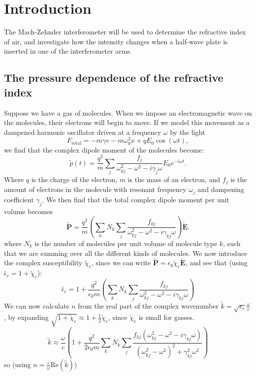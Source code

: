 \chapter{Introduction}
The Mach-Zehnder interferometer will be used to determine the refractive index of air, 
and investigate how the intensity changes when a half-wave plate is inserted in one of the interferometer arms.
\section{The pressure dependence of the refractive index}
Suppose we have a gas of molecules. 
When we impose an electromagnetic wave on the molecules, 
their electrons will begin to move. 
If we model this movement as a dampened harmonic \mbox{oscillator} driven at a frequency $\omega$ by the light
\[F_\text{total} = -m\gamma v - m\omega_0^2 x + qE_0\cos(\omega t),\]
we find that the complex dipole moment of the molecules become\autocite{Eldyn}:
\[\tilde{p}(t) = \frac{q^2}{m} \sum_j \frac{f_j}{\omega_{kj}^2 - \omega^2 - i\gamma_j \omega}E_0e^{-i\omega t}.\]
Where $q$ is the charge of the electron, $m$ is the mass of an electron, and $f_j$ is the amount of electrons in the molecule with resonant frequency $\omega_j$ and dampening coefficient $\gamma_j$.
We then find that the total complex dipole moment per unit volume becomes
\[\tilde{\mathbf{P}} = \frac{q^2}{m} \left( \sum_k N_k \sum_j \frac{f_{kj}}{\omega_{kj}^2 - \omega^2 - i\gamma_{kj} \omega} \right) \tilde{\mathbf{E}}.\]
where $N_k$ is the number of molecules per unit volume of molecule type $k$, such that we are summing over all the different kinds of molecules.
We now introduce the complex susceptibility $\tilde{\chi}_e$,
since we can write $\tilde{\mathbf{P}} = \epsilon_0 \tilde{\chi}_e \tilde{\mathbf{E}}$, and see that (using $\tilde{\epsilon_r} = 1 + \tilde{\chi}_e$):
\[\tilde{\epsilon_r} = 1 + \frac{q^2}{\epsilon_0 m} \left( \sum_k N_k \sum_j \frac{f_{kj}}{\omega_{kj}^2 - \omega^2 - i\gamma_{kj} \omega} \right)\]
We can now calculate $n$ from the real part of the complex wavenumber $\tilde{k} = \sqrt{\epsilon_r} \frac{\omega}{c}$, by expanding $\sqrt{1 + \tilde{\chi}_e} \approx 1 + \frac{1}{2}\tilde{\chi}_e$, since $\tilde{\chi}_e$ is small for gasses\autocite{Eldyn}.
\[
    \tilde{k} \approx \frac{\omega}{c} \left( 1 + \frac{q^2}{2\epsilon_0 m} \sum_k N_k \sum_j \frac{f_{kj}(\omega_{kj}^2 - \omega^2 - i\gamma_{kj} \omega)}{(\omega_{kj}^2 - \omega^2)^2 + \gamma_{kj}^2 \omega^2}  \right)
\]
so (using $n = \frac{c}{\omega}\text{Re}(\tilde{k})$)

